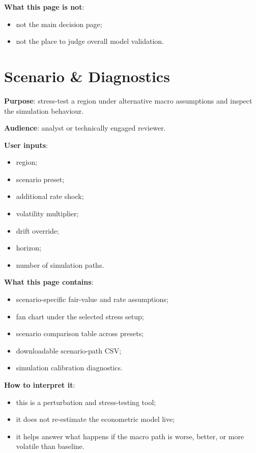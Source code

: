 \documentclass[11pt,a4paper]{article}
\begin{document}
\textbf{What this page is not}:
\begin{itemize}[leftmargin=1.5em]
  \item not the main decision page;
  \item not the place to judge overall model validation.
\end{itemize}

\section{Scenario \& Diagnostics}

\textbf{Purpose}: stress-test a region under alternative macro assumptions and
inspect the simulation behaviour.

\textbf{Audience}: analyst or technically engaged reviewer.

\textbf{User inputs}:
\begin{itemize}[leftmargin=1.5em]
  \item region;
  \item scenario preset;
  \item additional rate shock;
  \item volatility multiplier;
  \item drift override;
  \item horizon;
  \item number of simulation paths.
\end{itemize}

\textbf{What this page contains}:
\begin{itemize}[leftmargin=1.5em]
  \item scenario-specific fair-value and rate assumptions;
  \item fan chart under the selected stress setup;
  \item scenario comparison table across presets;
  \item downloadable scenario-path CSV;
  \item simulation calibration diagnostics.
\end{itemize}

\textbf{How to interpret it}:
\begin{itemize}[leftmargin=1.5em]
  \item this is a perturbation and stress-testing tool;
  \item it does not re-estimate the econometric model live;
  \item it helps answer what happens if the macro path is worse, better, or more volatile than baseline.
\end{itemize}
\end{document}
